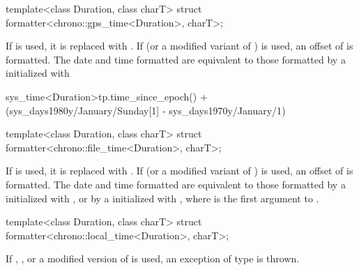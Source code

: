 %
\begin{itemdecl}
template<class Duration, class charT>
  struct formatter<chrono::gps_time<Duration>, charT>;
\end{itemdecl}

\begin{itemdescr}
\pnum
\remarks
If  is used,
it is replaced with .
If  (or a modified variant of ) is used,
an offset of  is formatted.
The date and time formatted are equivalent to
those formatted by a  initialized with
\begin{codeblock}
sys_time<Duration>{tp.time_since_epoch()} +
  (sys_days{1980y/January/Sunday[1]} - sys_days{1970y/January/1})
\end{codeblock}
\end{itemdescr}

%
\begin{itemdecl}
template<class Duration, class charT>
  struct formatter<chrono::file_time<Duration>, charT>;
\end{itemdecl}

\begin{itemdescr}
\pnum
\remarks
If  is used,
it is replaced with .
If  (or a modified variant of ) is used,
an offset of  is formatted.
The date and time formatted are equivalent to
those formatted
by a  initialized with , or
by a  initialized with ,
where  is the first argument to .
\end{itemdescr}

%
\begin{itemdecl}
template<class Duration, class charT>
  struct formatter<chrono::local_time<Duration>, charT>;
\end{itemdecl}

\begin{itemdescr}
\pnum
\remarks
If , , or a modified version of  is used,
an exception of type  is thrown.
\end{itemdescr}

